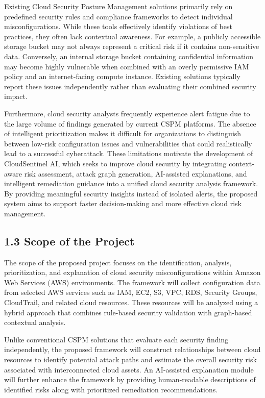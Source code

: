 Existing Cloud Security Posture Management solutions primarily rely on predefined security rules and compliance frameworks to detect individual misconfigurations. While these tools effectively identify violations of best practices, they often lack contextual awareness. For example, a publicly accessible storage bucket may not always represent a critical risk if it contains non-sensitive data. Conversely, an internal storage bucket containing confidential information may become highly vulnerable when combined with an overly permissive IAM policy and an internet-facing compute instance. Existing solutions typically report these issues independently rather than evaluating their combined security impact.

Furthermore, cloud security analysts frequently experience alert fatigue due to the large volume of findings generated by current CSPM platforms. The absence of intelligent prioritization makes it difficult for organizations to distinguish between low-risk configuration issues and vulnerabilities that could realistically lead to a successful cyberattack. These limitations motivate the development of CloudSentinel AI, which seeks to improve cloud security by integrating context-aware risk assessment, attack graph generation, AI-assisted explanations, and intelligent remediation guidance into a unified cloud security analysis framework. By providing meaningful security insights instead of isolated alerts, the proposed system aims to support faster decision-making and more effective cloud risk management.

\subsection{1.3 Scope of the Project}

The scope of the proposed project focuses on the identification, analysis, prioritization, and explanation of cloud security misconfigurations within Amazon Web Services (AWS) environments. The framework will collect configuration data from selected AWS services such as IAM, EC2, S3, VPC, RDS, Security Groups, CloudTrail, and related cloud resources. These resources will be analyzed using a hybrid approach that combines rule-based security validation with graph-based contextual analysis.

Unlike conventional CSPM solutions that evaluate each security finding independently, the proposed framework will construct relationships between cloud resources to identify potential attack paths and estimate the overall security risk associated with interconnected cloud assets. An AI-assisted explanation module will further enhance the framework by providing human-readable descriptions of identified risks along with prioritized remediation recommendations.

